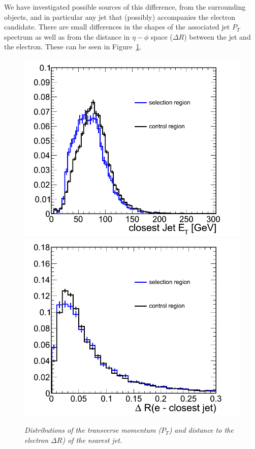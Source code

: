 We have investigated possible sources of this difference, from the surrounding objects, and in particular any jet that (possibly) accompanies the electron candidate.  There are small differences in the shapes of the associated jet $P_T$ spectrum as well as from the distance in $\eta-\phi$ space ($\Delta R$) between the jet and the electron.  These can be seen in Figure~\ref{fig:Pt-DR-comparison}.

\begin{figure}[h!]
\centering
\includegraphics[scale=0.32]{Plots/jetEt_dependence.png}
\includegraphics[scale=0.32]{Plots/dR_dependence.png}
\caption{\textit{Distributions of the transverse momentum ($P_T$) and distance to the electron $\Delta R$) of the nearest jet.}}\label{fig:Pt-DR-comparison}
\end{figure}

